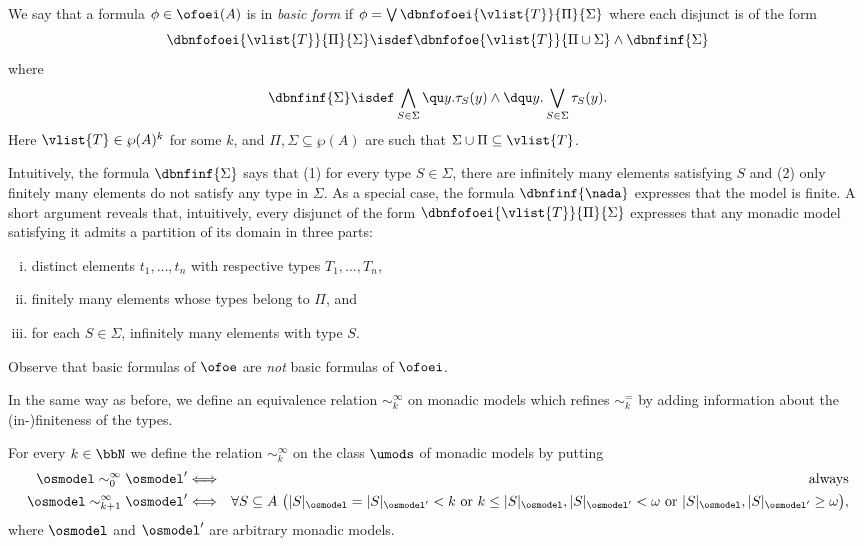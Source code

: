 \begin{definition}\label{def:basicform_fofoei}
We say that a formula $\phi \in \ofoei(A)$ is in \emph{basic form} if 
$\phi = \bigvee \dbnfofoei{\vlist{T}}{\Pi}{\Sigma}$ where each disjunct is 
of the form
%
\[
\dbnfofoei{\vlist{T}}{\Pi}{\Sigma} \isdef \dbnfofoe{\vlist{T}}{\Pi \cup \Sigma} 
  \land \dbnfinf{\Sigma}
\]
where
\[
\dbnfinf{\Sigma} \isdef  
\bigwedge_{S\in\Sigma} \qu y.\tau_S(y) \land 
  \dqu y.\bigvee_{S\in\Sigma} \tau_S(y).
\]
Here $\vlist{T} \in \wp(A)^{k}$ for some $k$, and $\Pi,\Sigma \subseteq \wp(A)$ 
are such that $\Sigma \cup \Pi \subseteq \vlist{T}$.
\end{definition}

Intuitively, the formula $\dbnfinf{\Sigma}$ says that (1) for every type $S\in
\Sigma$, there are infinitely many elements satisfying $S$ and (2) only finitely
many elements do not satisfy any type in $\Sigma$.
As a special case, the formula $\dbnfinf{\nada}$ expresses that the model is 
finite.
A short argument reveals that, intuitively, every disjunct of the form
$\dbnfofoei{\vlist{T}}{\Pi}{\Sigma}$ expresses that any monadic model satisfying
it admits a partition of its domain in three parts:
\begin{enumerate}[(i)]
 pt
\item distinct elements $t_1,\dots,t_n$ with respective types $T_1,\dots,T_n$,
\item finitely many elements whose types belong to $\Pi$, and
\item for each $S\in \Sigma$, infinitely many elements with type $S$.
\end{enumerate}
Observe that basic formulas of $\ofoe$ are \emph{not} basic formulas of 
$\ofoei$.

In the same way as before, we define an equivalence relation $\sim^\infty_k$ 
on monadic models which refines $\sim^=_{k}$ by adding information about the 
(in-)finiteness of the types.

\begin{definition}
For every $k \in \bbN$ we define the relation $\sim^{\infty}_k$ on the class 
$\umods$ of monadic models by putting
\begin{eqnarray*}
  \osmodel \sim^\infty_0 \osmodel' 
  & \Longleftrightarrow 
  & \text{always}
\\\osmodel \sim^\infty_{k+1} \osmodel' 
  & \Longleftrightarrow 
  & \forall S\subseteq A \ \big(
    |S|_\osmodel = |S|_{\osmodel'} < k 
    \text{ or }     k \leq |S|_\osmodel,|S|_{\osmodel'} < \omega
     \text{ or }    |S|_\osmodel,|S|_{\osmodel'} \geq \omega 
    \big),
\end{eqnarray*}
where $\osmodel$ and $\osmodel'$ are arbitrary monadic models. 
\end{definition}

